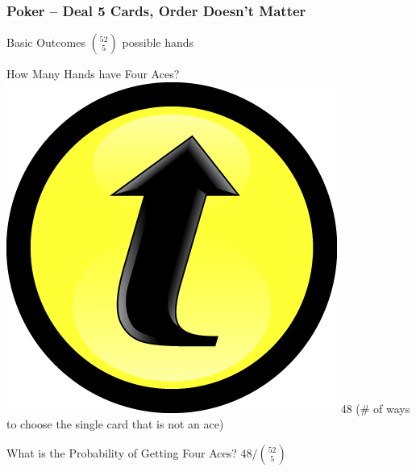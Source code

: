 \documentclass[handout]{beamer}
\begin{document}
\begin{frame}

\frametitle{Poker -- Deal 5 Cards, Order Doesn't Matter}

\begin{block}{Basic Outcomes}
\vspace{0.3em} \pause
$\displaystyle{52 \choose 5}$ possible hands
\end{block}\pause
\begin{block}{How Many Hands have Four Aces? \hfill \includegraphics[scale = 0.05]{./images/clicker} } \pause
\alert{48 (\# of ways to choose the single card that is not an ace)}
\end{block}\pause

\begin{block}{What is the Probability of Getting Four Aces?}
\vspace{0.3em} \pause
$48/\displaystyle{52 \choose 5}$
\end{block}


\end{frame}
\end{document}
